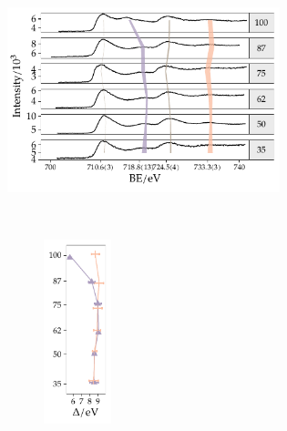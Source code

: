 \documentclass[draft,webedition,openright,titles,swedish,english]{LuaUUThesis}\usepackage[]{graphicx}\usepackage[]{xcolor}
\newenvironment{knitrout}{}{} %
\begin{document}
\begin{figure}[tbp]
\centering%
\begin{subfigure}[b]{0.66\textwidth}%
\begin{knitrout}\scriptsize
{}\color{fgcolor}

{\centering \includegraphics[width=3.11in]{figure/0503P-fig-xps-Fe2p-spectra-1} 

}


\end{knitrout}
\caption{}%
\label{fig:P03-XPS-Fe2p-spectra}%
\end{subfigure}%
\,%
\begin{subfigure}[b]{0.33\textwidth}%
\begin{subfigure}[b]{0.50\linewidth}%
\begin{knitrout}\scriptsize
{}\color{fgcolor}

{\centering \includegraphics[width=0.77in]{figure/0503P-fig-xps-Fe2p-satellite-delta-1} 

}


\end{knitrout}
\caption{}%
\label{fig:P03-XPS-Fe2p-satellite-delta}%
\end{subfigure}%
\begin{subfigure}[b]{0.50\linewidth}%
\begin{knitrout}\scriptsize
{}\color{fgcolor}


\end{knitrout}
\end{subfigure}
\end{subfigure}
\end{figure}
\end{document}
